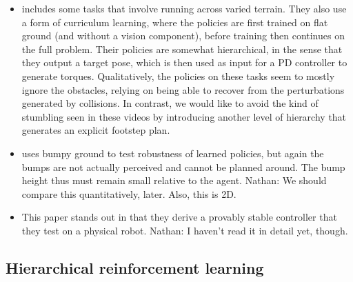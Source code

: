 \documentclass[a4paper]{article}
\newcommand{\nhatch}[1]{{\leavevmode\color{blue} Nathan: #1}}
\begin{document}
\begin{itemize}
  \item \cite{peng2018deepmimic} includes some tasks that involve running across varied terrain.
    They also use a form of curriculum learning, where the policies are first trained on flat ground (and without a vision component), before training then continues on the full problem.
    Their policies are somewhat hierarchical, in the sense that they output a target pose, which is then used as input for a PD controller to generate torques.
    Qualitatively, the policies on these tasks seem to mostly ignore the obstacles, relying on being able to recover from the perturbations generated by collisions.
    In contrast, we would like to avoid the kind of stumbling seen in these videos by introducing another level of hierarchy that generates an explicit footstep plan.

  \item \cite{peng2017learning} uses bumpy ground to test robustness of learned policies, but again the bumps are not actually perceived and cannot be planned around.
    The bump height thus must remain small relative to the agent.
    \nhatch{We should compare this quantitatively, later.} Also, this is 2D.

  \item \cite{manchester2011stable} This paper stands out in that they derive a provably stable controller that they test on a physical robot.
    \nhatch{I haven't read it in detail yet, though.}

\end{itemize}

\subsection*{Hierarchical reinforcement learning}
\end{document}

